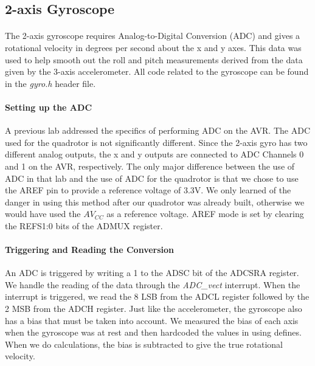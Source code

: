 \subsection{2-axis Gyroscope}

\paragraph{}
The 2-axis gyroscope requires Analog-to-Digital Conversion (ADC) and gives a rotational velocity in degrees per second about the x and y axes.  This data was used to help smooth out the roll and pitch measurements derived from the data given by the 3-axis accelerometer.  All code related to the gyroscope can be found in the {\it gyro.h} header file.

\paragraph{Setting up the ADC}
A previous lab addressed the specifics of performing ADC on the AVR.  The ADC used for the quadrotor is not significantly different.  Since the 2-axis gyro has two different analog outputs, the  x and y outputs are connected to ADC Channels 0 and 1 on the AVR, respectively.  The only major difference between the use of ADC in that lab and the use of ADC for the quadrotor is that we chose to use the AREF pin to provide a reference voltage of 3.3V.  We only learned of the danger in using this method after our quadrotor was already built, otherwise we would have used the $AV_{CC}$ as a reference voltage.  AREF mode is set by clearing the REFS1:0 bits of the ADMUX register.

\paragraph{Triggering and Reading the Conversion}
 An ADC is triggered by writing a 1 to the ADSC bit of the ADCSRA register.  We handle the reading of the data through the {\it ADC\_vect} interrupt.  When the interrupt is triggered, we read the 8 LSB from the ADCL register followed by the 2 MSB from the ADCH register.  Just like the accelerometer, the gyroscope also has a bias that must be taken into account.  We measured the bias of each axis when the gyroscope was at rest and then hardcoded the values in using defines.  When we do calculations, the bias is subtracted to give the true rotational velocity.

